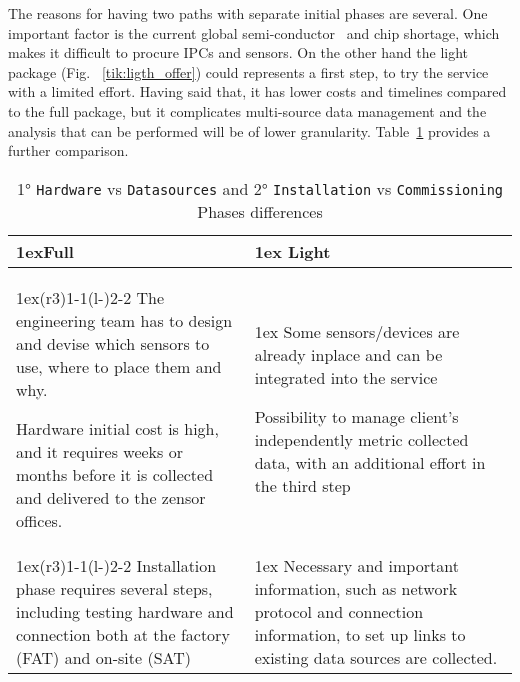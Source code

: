 The reasons for having two paths with separate initial phases are several. One important factor is the current global semi-conductor~\cite{Article:bbcnews_2021_chip} and chip shortage,
 which makes it difficult to procure \ac{IPCs} and sensors.
On the other hand the light package (Fig. ~\ref{tik:ligth_offer}) could represents a first step, to try the service with a limited effort.
Having said that, it has lower costs and timelines compared to the full package, but it complicates multi-source data management and the analysis that can be performed will be of lower granularity.
Table~\ref*{tab:phase_diff} provides a further comparison.
\begin{table}[ht]
	\begin{tabularx}{\textwidth}{>{\parskip1ex}X@{\kern4\tabcolsep}>{\parskip1ex}X}
		\toprule
		\hfil\bfseries Full
		 &
		\hfil\bfseries Light
		\\\cmidrule(r{3\tabcolsep}){1-1}\cmidrule(l{-\tabcolsep}){2-2}
		The engineering team has to design and devise which sensors to use, where to place them and why.\par
		Hardware initial cost is high, and it requires weeks or months before it is collected and delivered to the zensor offices.\par
		 &
		Some sensors/devices are already inplace and can be integrated into the service\par
		Possibility to manage client's independently metric collected data, with an additional effort in the third step\par
		\\\cmidrule(r{3\tabcolsep}){1-1}\cmidrule(l{-\tabcolsep}){2-2}
		Installation phase requires several steps, including testing hardware and connection both at the factory (FAT) and on-site (SAT)\par
		 &
		Necessary and important information, such as network protocol and connection information, to set up links to existing data sources are collected.\par
		\\\bottomrule
	\end{tabularx}
	\caption{1° \texttt{Hardware} vs \texttt{Datasources} and 2° \texttt{Installation} vs \texttt{Commissioning} Phases differences}
	\label{tab:phase_diff}
\end{table}

